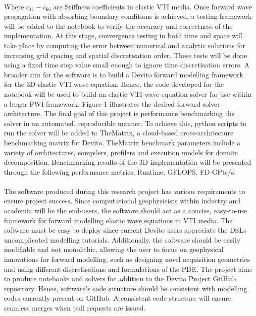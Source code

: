 \\
Where $c_{11}-c_{66}$ are Stiffness coefficients in elastic VTI media.
Once forward wave propagation with absorbing boundary conditions is achieved, a testing framework will be added to the notebook to verify the accuracy and correctness of the implementation. At this stage, convergence testing in both time and space will take place by computing the error between numerical and analytic solutions for increasing grid spacing and spatial discretisation order. These tests will be done using a fixed time step value small enough to ignore time discretisation errors. 
A broader aim for the software is to build a Devito forward modelling framework for the 3D elastic VTI wave equation. Hence, the code developed for the notebook will be used to build an elastic VTI wave equation solver for use within a larger FWI framework. Figure 1 illustrates the desired forward solver architecture. The final goal of this project is performance benchmarking the solver in an automated, reproducible manner. To achieve this, python scripts to run the solver will be added to TheMatrix, a cloud-based cross-architecture benchmarking matrix for Devito. TheMatrix benchmark parameters include a variety of architectures, compilers, profilers and execution models for domain decomposition. Benchmarking results of the 3D implementation will be presented through the following performance metrics; Runtime, GFLOPS, FD-GPts/s. \\ 
\newpage \\
The software produced during this research project has various requirements to ensure project success. Since computational geophysicists within industry and academia will be the end-users, the software should act as a concise, easy-to-use framework for forward modelling elastic wave equations in VTI media. The software must be easy to deploy since current Devito users appreciate the DSLs uncomplicated modelling tutorials. Additionally, the software should be easily modifiable and not monolithic, allowing the user to focus on geophysical innovations for forward modelling, such as designing novel acquisition geometries and using different discretisations and formulations of the PDE. The project aims to produce notebooks and solvers for addition to the Devito Project GitHub repository. Hence, software's code structure should be consistent with modelling codes currently present on GitHub. A consistent code structure will ensure seamless merges when pull requests are issued. \\
\\
